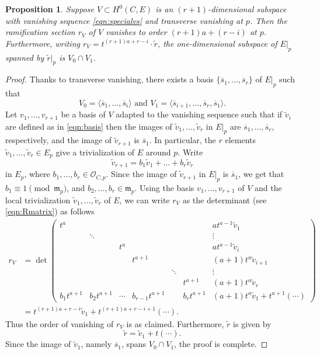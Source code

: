 \documentclass[11pt,reqno]{amsart}
\theoremstyle{plain}
\newtheorem{proposition}[theorem]{Proposition}
\theoremstyle{definition}
\theoremstyle{remark}
\numberwithin{equation}{section}
\numberwithin{equation}{section}
\renewcommand{\O}{\mathcal O}
\begin{document}
\begin{proposition}\label{prop:agreement}
  Suppose $V \subset H^0(C, E)$ is an $(r+1)$-dimensional subspace with vanishing sequence \eqref{eqn:specialvs} and transverse vanishing at $p$.
  Then the ramification section $r_V$ of $V$ vanishes to order $(r+1)a + (r-i)$ at $p$.
  Furthermore, writing $r_V = t^{(r+1)a+r-i} \cdot \widetilde r$, the one-dimensional subspace of $E|_p$ spanned by $\widetilde r|_p$ is $V_0 \cap V_1$.
\end{proposition}
\begin{proof}
  Thanks to transverse vanishing, there exists a basis $\{\overline s_1, \dots, \overline s_{r} \}$ of $E|_p$ such that
  \[ V_0 = \langle  \overline s_1, \dots, \overline s_i \rangle \text{ and } V_1 = \langle  \overline s_{i+1}, \dots, \overline s_r, \overline s_1 \rangle.\]
  Let $v_1, \dots, v_{r+1}$ be a basis of $V$ adapted to the vanishing sequence such that if $\widetilde v_i$ are defined as in \eqref{eqn:basis} then the images of $\widetilde v_1, \dots, \widetilde v_r$ in $E|_p$ are $\overline s_1, \dots, \overline s_r$, respectively, and the image of $\widetilde v_{r+1}$ is $\overline s_1$.
  In particular, the $r$ elements $\widetilde v_1, \dots, \widetilde v_r \in E_p$ give a trivialization of $E$ around $p$.
  Write
  \[ \widetilde v_{r+1} = b_1 \widetilde v_1 + \dots + b_r \widetilde v_r\]
  in $E_p$, where $b_1, \dots, b_r \in \O_{C,p}$.
  Since the image of $\widetilde v_{r+1}$ in $E|_p$ is $\overline s_1$, we get that $b_1 \equiv 1 \pmod {\mathfrak m_p}$, and $b_2, \dots, b_r \in \mathfrak m_p$.  
  Using the basis $v_1, \dots, v_{r+1}$ of $V$ and the local trivialization $\widetilde v_1, \dots, \widetilde v_r$ of $E$, we can write $r_V$ as the determinant (see \eqref{eqn:Rmatrix}) as follows
  \begin{align*}
    r_V &= \det
    \begin{pmatrix}
      t^a & & & & & &  at^{a-1}\widetilde v_1\\
       & \ddots & & & & &\vdots\\
       & & t^a  & & & &a t^{a-1}\widetilde v_i\\
       & & & t^{a+1}  & & &(a+1)t^a \widetilde v_{i+1} \\
       & & & & \ddots & & \vdots\\
       & & & & &t^{a+1} &(a+1)t^{a}\widetilde v_r\\
      b_1t^{a+1}& b_2 t^{a+1} & \cdots & b_{r-1}t^{a+1} & & b_rt^{a+1} & (a+1)t^a\widetilde v_1 + t^{a+1}(\cdots)
    \end{pmatrix}\\
        &= t^{(r+1)a+r-i} \widetilde v_1  + t^{(r+1)a+r-i+1} (\cdots).
  \end{align*}
  Thus the order of vanishing of $r_V$ is as claimed.
  Furthermore, $\widetilde r$ is given by
  \[ \widetilde r = \widetilde v_1 + t (\cdots).\]
  Since the image of $\widetilde v_1$, namely $\overline s_1$, spans $V_0 \cap V_1$, the proof is complete.
\end{proof}
\end{document}
